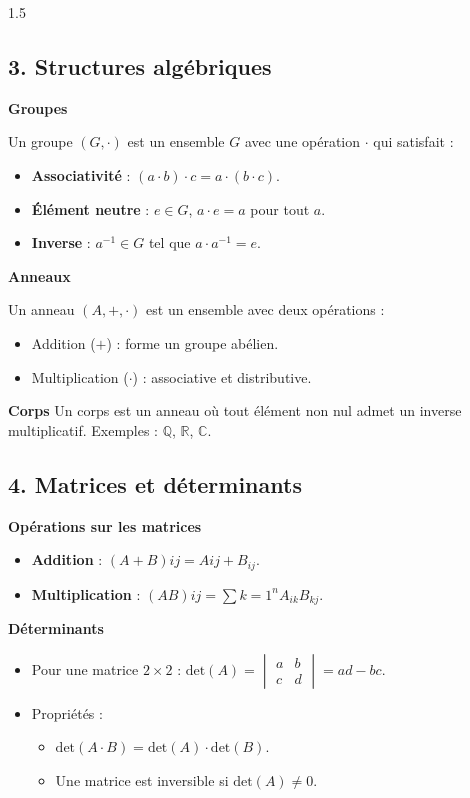 \documentclass[12pt]{article}
\begin{document}
\begin{spacing}{1.5}
\subsection*{3. Structures algébriques}

\textbf{Groupes}

Un groupe $(G, \cdot)$ est un ensemble $G$ avec une opération $\cdot$ qui satisfait :
\begin{itemize}
    \item \textbf{Associativité} : $(a \cdot b) \cdot c = a \cdot (b \cdot c)$.
    \item \textbf{Élément neutre} : $e \in G$, $a \cdot e = a$ pour tout $a$.
    \item \textbf{Inverse} : $a^{-1} \in G$ tel que $a \cdot a^{-1} = e$.
\end{itemize}

\textbf{Anneaux}

Un anneau $(A, +, \cdot)$ est un ensemble avec deux opérations :
\begin{itemize}
    \item Addition ($+$) : forme un groupe abélien.
    \item Multiplication ($\cdot$) : associative et distributive.
\end{itemize}

\textbf{Corps}
Un corps est un anneau où tout élément non nul admet un inverse multiplicatif.
Exemples : $\mathbb{Q}$, $\mathbb{R}$, $\mathbb{C}$.

\subsection*{4. Matrices et déterminants}
\textbf{Opérations sur les matrices}

\begin{itemize}
    \item \textbf{Addition} : $(A + B){ij} = A{ij} + B_{ij}$.
    \item \textbf{Multiplication} : $(AB){ij} = \sum{k=1}^n A_{ik} B_{kj}$.
\end{itemize}

\textbf{Déterminants}

\begin{itemize}
    \item Pour une matrice $2 \times 2$ :  
    $\text{det}(A) = \begin{vmatrix} a & b \\
    c & d \end{vmatrix} = ad - bc$.
    \item Propriétés : 
    \begin{itemize}
        \item $\text{det}(A \cdot B) = \text{det}(A) \cdot \text{det}(B)$.
        \item Une matrice est inversible si $\text{det}(A) \neq 0$.
    \end{itemize}
\end{itemize}


\end{spacing}
\end{document}
